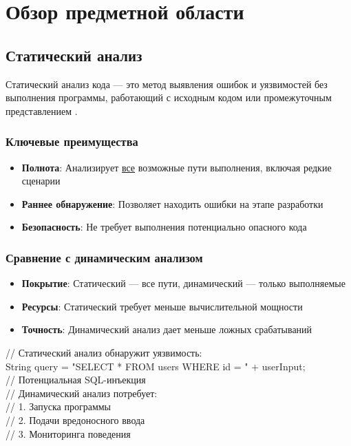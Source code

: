 \section{Обзор предметной области}

\subsection{Статический анализ}
Статический анализ кода — это метод выявления ошибок и уязвимостей без выполнения программы, работающий с исходным кодом или промежуточным представлением \cite{CousotCousot77}.

\subsubsection{Ключевые преимущества}
\begin{itemize}[leftmargin=*]
    \item \textbf{Полнота}: Анализирует \underline{все} возможные пути выполнения, включая редкие сценарии
    \item \textbf{Раннее обнаружение}: Позволяет находить ошибки на этапе разработки
    \item \textbf{Безопасность}: Не требует выполнения потенциально опасного кода
\end{itemize}

\subsubsection{Сравнение с динамическим анализом}
\begin{itemize}[leftmargin=*]
    \item \textbf{Покрытие}: Статический — все пути, динамический — только выполняемые
    \item \textbf{Ресурсы}: Статический требует меньше вычислительной мощности
    \item \textbf{Точность}: Динамический анализ дает меньше ложных срабатываний
\end{itemize}

\begin{codebox}
// Статический анализ обнаружит уязвимость:\\
String query = "SELECT * FROM users WHERE id = " + userInput;\\
// Потенциальная SQL-инъекция\\

// Динамический анализ потребует:\\
// 1. Запуска программы\\
// 2. Подачи вредоносного ввода\\
// 3. Мониторинга поведения\\
\end{codebox}

